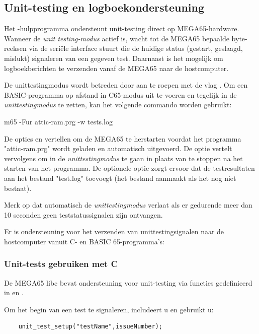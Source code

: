 \subsection{Unit-testing en logboekondersteuning}

Het -hulpprogramma ondersteunt unit-testing
direct op MEGA65-hardware. Wanneer de \textit{unit testing-modus} actief is,
wacht  tot de MEGA65 bepaalde byte-reeksen via de
seriële interface stuurt die de huidige status (gestart, geslaagd, mislukt) signaleren
van een gegeven test. Daarnaast is het mogelijk om logboekberichten te verzenden vanaf
de MEGA65 naar de hostcomputer.

De unittestingmodus wordt betreden door  aan te roepen met de vlag .
Om een BASIC-programma op afstand in C65-modus uit te voeren en tegelijk 
in de \textit{unittestingmodus} te zetten, kan het volgende commando worden gebruikt:

\begin{screencode}
    m65 -Fur attic-ram.prg -w tests.log
\end{screencode}

De opties  en  vertellen  om de MEGA65 te herstarten
voordat het programma "attic-ram.prg" wordt geladen en automatisch uitgevoerd.
De optie  vertelt  vervolgens om in de \textit{unittestingmodus} te gaan
in plaats van te stoppen na het starten van het programma.
De optionele optie  zorgt ervoor dat  de testresultaten aan het
bestand "test.log" toevoegt (het bestand aanmaakt als het nog niet bestaat).

Merk op dat  automatisch de \textit{unittestingmodus} verlaat
als er gedurende meer dan 10 seconden geen teststatussignalen zijn ontvangen.

Er is ondersteuning voor het verzenden van unittestingsignalen naar de hostcomputer vanuit
C- en BASIC 65-programma's:

\subsubsection{Unit-tests gebruiken met C}

De MEGA65 libc bevat ondersteuning voor unit-testing via functies gedefinieerd in
 en .

Om het begin van een test te signaleren, includeert u  en gebruikt u:

\begin{verbatim}
    unit_test_setup("testName",issueNumber);
\end{verbatim}

